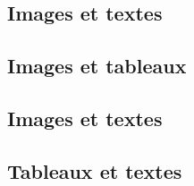 \newpage
\subsection{Images et textes}

\newpage
\subsection{Images et tableaux}


\newpage
\subsection{Images et textes}


\newpage
\subsection{Tableaux et textes}



